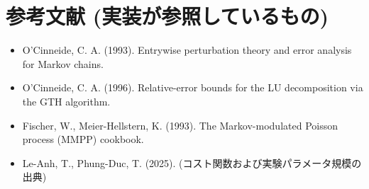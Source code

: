 \documentclass[a4paper,11pt]{article}
\begin{document}
\section*{参考文献 (実装が参照しているもの)}
\begin{itemize}
\item O'Cinneide, C. A. (1993). Entrywise perturbation theory and error analysis
      for Markov chains.
\item O'Cinneide, C. A. (1996). Relative-error bounds for the LU decomposition
      via the GTH algorithm.
\item Fischer, W., Meier-Hellstern, K. (1993). The Markov-modulated Poisson
      process (MMPP) cookbook.
\item Le-Anh, T., Phung-Duc, T. (2025). (コスト関数および実験パラメータ規模の出典)
\end{itemize}
\end{document}

